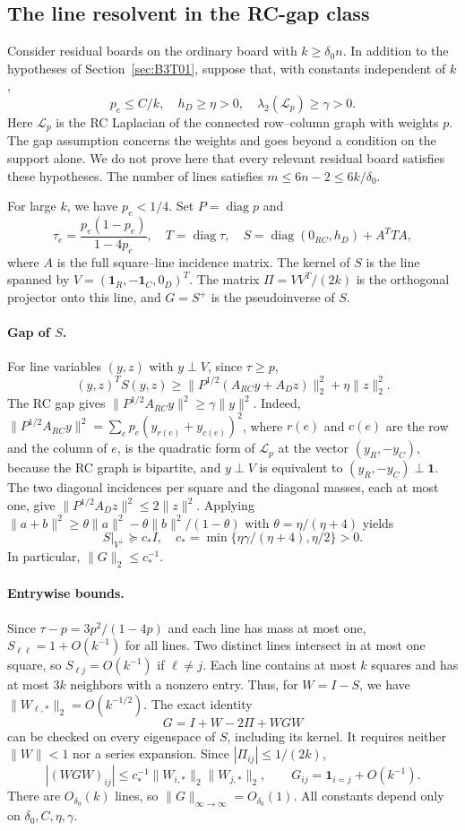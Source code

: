 \subsection{The line resolvent in the RC-gap class}\label{sec:B3T05}
Consider residual boards on the ordinary board with $k\ge\delta_0 n$. In addition to the hypotheses of
Section~\ref{sec:B3T01}, suppose that, with constants independent of $k$,
\[
 p_e\le C/k,\quad h_D\ge\eta>0,\quad
 \lambda_2(\mathscr L_p)\ge\gamma>0.
\]
Here $\mathscr L_p$ is the RC Laplacian of the connected row--column graph with weights $p$. The gap
assumption concerns the weights and goes beyond a condition on the support alone. We do not prove here that
every relevant residual board satisfies these hypotheses. The number of lines satisfies
$m\le6n-2\le6k/\delta_0$.

For large $k$, we have $p_e<1/4$. Set $P=\operatorname{diag}p$ and
\[
 \tau_e=\frac{p_e(1-p_e)}{1-4p_e},\quad T=\operatorname{diag}\tau,
 \quad S=\operatorname{diag}(0_{RC},h_D)+A^TTA,
\]
where $A$ is the full square--line incidence matrix.
The kernel of $S$ is the line spanned by $V=(\mathbf1_R,-\mathbf1_C,0_D)^T$. The matrix $\Pi=VV^T/(2k)$ is
the orthogonal projector onto this line, and $G=S^+$ is the pseudoinverse of $S$.

\paragraph{Gap of $S$.}
For line variables $(y,z)$ with $y\perp V$, since $\tau\ge p$,
\[
 (y,z)^TS(y,z)\ge
 \|P^{1/2}(A_{RC}y+A_Dz)\|_2^2+\eta\|z\|_2^2.
\]
The RC gap gives $\|P^{1/2}A_{RC}y\|^2\ge\gamma\|y\|^2$.
Indeed, $\|P^{1/2}A_{RC}y\|^2=\sum_ep_e(y_{r(e)}+y_{c(e)})^2$, where $r(e)$ and $c(e)$ are the row
and the column of $e$, is the quadratic form of $\mathscr L_p$ at the vector $(y_R,-y_C)$, because the
RC graph is bipartite, and $y\perp V$ is equivalent to $(y_R,-y_C)\perp\mathbf1$.
The two diagonal incidences per square and the diagonal masses, each at most one, give
$\|P^{1/2}A_Dz\|^2\le2\|z\|^2$.
Applying $\|a+b\|^2\ge\theta\|a\|^2-\theta\|b\|^2/(1-\theta)$ with $\theta=\eta/(\eta+4)$ yields
\[
 S|_{V^\perp}\succeq c_* I,\quad
 c_*=\min\{\eta\gamma/(\eta+4),\eta/2\}>0.
\]
In particular, $\|G\|_2\le c_*^{-1}$.

\paragraph{Entrywise bounds.}
Since $\tau-p=3p^2/(1-4p)$ and each line has mass at most one, $S_{\ell\ell}=1+O(k^{-1})$ for all lines.
Two distinct lines intersect in at most one square, so $S_{\ell j}=O(k^{-1})$ if $\ell\ne j$.
Each line contains at most $k$ squares and has at most $3k$ neighbors with a nonzero entry. Thus, for
$W=I-S$, we have $\|W_{\ell,*}\|_2=O(k^{-1/2})$.
The exact identity
\[
 G=I+W-2\Pi+WGW
\]
can be checked on every eigenspace of $S$, including its kernel. It requires neither $\|W\|<1$ nor a series
expansion.
Since $|\Pi_{ij}|\le1/(2k)$,
\[
 |(WGW)_{ij}|\le c_*^{-1}\|W_{i,*}\|_2\|W_{j,*}\|_2,
 \qquad \boxed{G_{ij}=\mathbf1_{i=j}+O(k^{-1}).}
\]
There are $O_{\delta_0}(k)$ lines, so $\|G\|_{\infty\to\infty}=O_{\delta_0}(1)$. All constants depend only
on $\delta_0,C,\eta,\gamma$.

